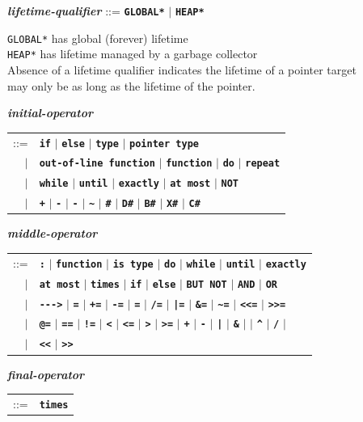 \documentclass[12pt]{article}
\newcommand{\TT}[1]{{\tt \bfseries #1}}
\newcommand{\emkey}[1]{{\em \bfseries #1}}
\newcommand{\ttakey}[1]{{\tt \bfseries *#1*}}
\newenvironment{indpar}[1][0.3in]%
	{\begin{list}{}%
		     {\setlength{\itemsep}{0in}%
		      \setlength{\topsep}{0in}%
		      \setlength{\parsep}{1ex}%
		      \setlength{\labelwidth}{#1}%
		      \setlength{\leftmargin}{#1}%
		      \addtolength{\leftmargin}{\labelsep}}%
	 \item}%
	{\end{list}}
\begin{document}
\begin{indpar}
\emkey{lifetime-qualifier}\label{LIFETIME-QUALIFIER}
    ::= \ttakey{GLOBAL} $|$ \ttakey{HEAP}
\begin{indpar}
{\tt *GLOBAL*} has global (forever) lifetime \\
{\tt *HEAP*} has lifetime managed by a garbage collector \\
Absence of a lifetime qualifier indicates the lifetime of a pointer target \\
may only be as long as the lifetime of the pointer.
\end{indpar}

\emkey{initial-operator}
    \begin{tabular}[t]{rl}
    ::= & \TT{if} $|$ \TT{else} $|$ \TT{type} $|$ \TT{pointer type} \\
    $|$ & \TT{out-of-line function}
    $|$ \TT{function}
    $|$ \TT{do}
    $|$ \TT{repeat} \\
    $|$ & \TT{while}
    $|$ \TT{until}
    $|$ \TT{exactly}
    $|$ \TT{at most}
    $|$ \TT{NOT} \\
    $|$ & \TT{+}
    $|$ \TT{-}
    $|$ \TT{-}
    $|$ \TT{\textasciitilde}
    $|$ \TT{\#}
    $|$ \TT{D\#}
    $|$ \TT{B\#}
    $|$ \TT{X\#}
    $|$ \TT{C\#}
    \end{tabular}

\emkey{middle-operator}
    \begin{tabular}[t]{rl}
    ::= & \TT{:}
    $|$ \TT{function}
    $|$ \TT{is type}
    $|$ \TT{do}
    $|$ \TT{while}
    $|$ \TT{until}
    $|$ \TT{exactly} \\
    $|$ & \TT{at most}
    $|$ \TT{times}
    $|$ \TT{if}
    $|$ \TT{else}
    $|$ \TT{BUT NOT}
    $|$ \TT{AND}
    $|$ \TT{OR} \\
    $|$ & \TT{-{}-{}-{}>}
    $|$ \TT{=}
    $|$ \TT{+=}
    $|$ \TT{-=}
    $|$ \TT{*=}
    $|$ \TT{/=}
    $|$ \TT{|=}
    $|$ \TT{\&=}
    $|$ \TT{\textasciitilde =}
    $|$ \TT{<{}<=}
    $|$ \TT{>{}>=} \\
    $|$ & \TT{@=}
    $|$ \TT{==}
    $|$ \TT{!=}
    $|$ \TT{<}
    $|$ \TT{<=}
    $|$ \TT{>}
    $|$ \TT{>=}
    $|$ \TT{+}
    $|$ \TT{-}
    $|$ \TT{|}
    $|$ \TT{\&}
    $|$ \TT{}
    $|$ \TT{\textasciicircum}
    $|$ \TT{/}
    $|$ \TT{*} \\
    $|$ & \TT{<{}<}
    $|$ \TT{>{}>}
    \end{tabular}

\emkey{final-operator}
    \begin{tabular}[t]{rl}
    ::= & \TT{times}
    \end{tabular}


\end{indpar}
\end{document}
